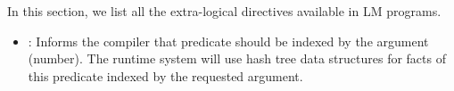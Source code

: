 
In this section, we list all the extra-logical directives available in LM
programs.


\begin{itemize}
   \item {}: Informs the compiler that predicate 
      should be indexed by the argument  (number). The runtime system
      will use hash tree data structures for facts of this predicate indexed by
      the requested argument.
\end{itemize}
